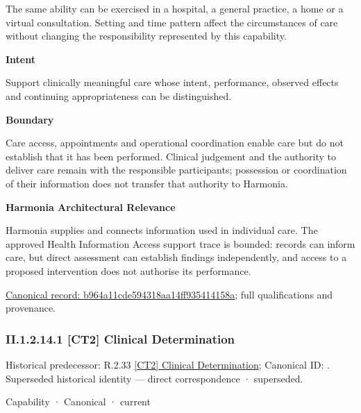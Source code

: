 The same ability can be exercised in a hospital, a general practice, a home or a virtual consultation. Setting and time pattern affect the circumstances of care without changing the responsibility represented by this capability.



\textbf{Intent}



Support clinically meaningful care whose intent, performance, observed effects and continuing appropriateness can be distinguished.



\textbf{Boundary}



Care access, appointments and operational coordination enable care but do not establish that it has been performed. Clinical judgement and the authority to deliver care remain with the responsible participants; possession or coordination of their information does not transfer that authority to Harmonia.



\textbf{Harmonia Architectural Relevance}



Harmonia supplies and connects information used in individual care. The approved Health Information Access support trace is bounded: records can inform care, but direct assessment can establish findings independently, and access to a proposed intervention does not authorise its performance.


{\footnotesize \href{../../../../continuum/strategy/capability/b964a11cde594318aa14ff935414158a.md}{Canonical record: b964a11cde594318aa14ff935414158a}; full qualifications and provenance.}\par
\subsubsection*{II.1.2.14.1 [CT2] Clinical Determination}
\label{navigation:II.1.2.14.1}

{\small Historical predecessor: R.2.33 \hyperref[element:018ccd818ec142fba1ffb086d900acc6]{[CT2] Clinical Determination}; Canonical ID: \texttt{}. Superseded historical identity — direct correspondence · superseded.}\par
\label{element:39219464b6304b59bd7c3de4e237066e}
{\small Capability · Canonical · current}\par

